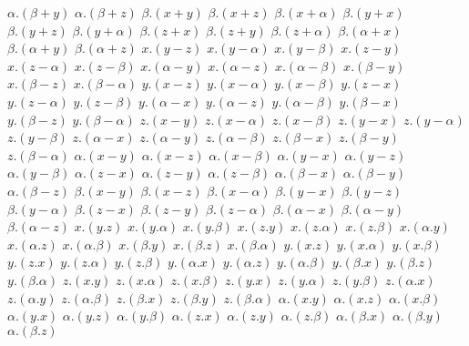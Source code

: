 $ \alpha . (\beta + y) $
$ \alpha . (\beta + z) $
$ \beta . (x + y) $
$ \beta . (x + z) $
$ \beta . (x + \alpha) $
$ \beta . (y + x) $
$ \beta . (y + z) $
$ \beta . (y + \alpha) $
$ \beta . (z + x) $
$ \beta . (z + y) $
$ \beta . (z + \alpha) $
$ \beta . (\alpha + x) $
$ \beta . (\alpha + y) $
$ \beta . (\alpha + z) $
$ x . (y - z) $
$ x . (y - \alpha) $
$ x . (y - \beta) $
$ x . (z - y) $
$ x . (z - \alpha) $
$ x . (z - \beta) $
$ x . (\alpha - y) $
$ x . (\alpha - z) $
$ x . (\alpha - \beta) $
$ x . (\beta - y) $
$ x . (\beta - z) $
$ x . (\beta - \alpha) $
$ y . (x - z) $
$ y . (x - \alpha) $
$ y . (x - \beta) $
$ y . (z - x) $
$ y . (z - \alpha) $
$ y . (z - \beta) $
$ y . (\alpha - x) $
$ y . (\alpha - z) $
$ y . (\alpha - \beta) $
$ y . (\beta - x) $
$ y . (\beta - z) $
$ y . (\beta - \alpha) $
$ z . (x - y) $
$ z . (x - \alpha) $
$ z . (x - \beta) $
$ z . (y - x) $
$ z . (y - \alpha) $
$ z . (y - \beta) $
$ z . (\alpha - x) $
$ z . (\alpha - y) $
$ z . (\alpha - \beta) $
$ z . (\beta - x) $
$ z . (\beta - y) $
$ z . (\beta - \alpha) $
$ \alpha . (x - y) $
$ \alpha . (x - z) $
$ \alpha . (x - \beta) $
$ \alpha . (y - x) $
$ \alpha . (y - z) $
$ \alpha . (y - \beta) $
$ \alpha . (z - x) $
$ \alpha . (z - y) $
$ \alpha . (z - \beta) $
$ \alpha . (\beta - x) $
$ \alpha . (\beta - y) $
$ \alpha . (\beta - z) $
$ \beta . (x - y) $
$ \beta . (x - z) $
$ \beta . (x - \alpha) $
$ \beta . (y - x) $
$ \beta . (y - z) $
$ \beta . (y - \alpha) $
$ \beta . (z - x) $
$ \beta . (z - y) $
$ \beta . (z - \alpha) $
$ \beta . (\alpha - x) $
$ \beta . (\alpha - y) $
$ \beta . (\alpha - z) $
$ x . (y . z) $
$ x . (y . \alpha) $
$ x . (y . \beta) $
$ x . (z . y) $
$ x . (z . \alpha) $
$ x . (z . \beta) $
$ x . (\alpha . y) $
$ x . (\alpha . z) $
$ x . (\alpha . \beta) $
$ x . (\beta . y) $
$ x . (\beta . z) $
$ x . (\beta . \alpha) $
$ y . (x . z) $
$ y . (x . \alpha) $
$ y . (x . \beta) $
$ y . (z . x) $
$ y . (z . \alpha) $
$ y . (z . \beta) $
$ y . (\alpha . x) $
$ y . (\alpha . z) $
$ y . (\alpha . \beta) $
$ y . (\beta . x) $
$ y . (\beta . z) $
$ y . (\beta . \alpha) $
$ z . (x . y) $
$ z . (x . \alpha) $
$ z . (x . \beta) $
$ z . (y . x) $
$ z . (y . \alpha) $
$ z . (y . \beta) $
$ z . (\alpha . x) $
$ z . (\alpha . y) $
$ z . (\alpha . \beta) $
$ z . (\beta . x) $
$ z . (\beta . y) $
$ z . (\beta . \alpha) $
$ \alpha . (x . y) $
$ \alpha . (x . z) $
$ \alpha . (x . \beta) $
$ \alpha . (y . x) $
$ \alpha . (y . z) $
$ \alpha . (y . \beta) $
$ \alpha . (z . x) $
$ \alpha . (z . y) $
$ \alpha . (z . \beta) $
$ \alpha . (\beta . x) $
$ \alpha . (\beta . y) $
$ \alpha . (\beta . z) $
